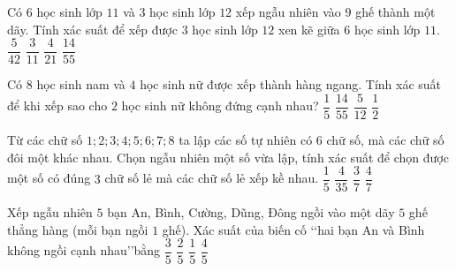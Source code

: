 \begin{ex}%
Có $6$ học sinh lớp $11$ và $3$ học sinh lớp $12$ xếp ngẫu nhiên vào $9$ ghế thành một dãy. Tính xác suất để xếp được $3$ học sinh lớp $12$ xen kẽ giữa $6$ học sinh lớp $11$.
\choice
{\True $\dfrac{5}{42}$}
{$\dfrac{3}{11}$}
{$\dfrac{4}{21}$}
{$\dfrac{14}{55}$}
\end{ex}

\begin{ex}%
Có $8$ học sinh nam và $4$ học sinh nữ được xếp thành hàng ngang. Tính xác suất để khi xếp sao cho $2$ học sinh nữ không đứng cạnh nhau?
\choice
{$\dfrac{1}{5}$}
{\True $\dfrac{14}{55}$}
{$\dfrac{5}{12}$}
{$\dfrac{1}{2}$}
\end{ex}

\begin{ex}%
Từ các chữ số $1; 2; 3; 4; 5; 6; 7; 8$ ta lập các số tự nhiên có $6$ chữ số, mà các chữ số đôi một khác nhau. Chọn ngẫu nhiên một số vừa lập, tính xác suất để chọn được một số có đúng $3$ chữ số lẻ mà các chữ số lẻ xếp kề nhau.
\choice
{$\dfrac{1}{5}$}
{\True $\dfrac{4}{35}$}
{$\dfrac{3}{7}$}
{$\dfrac{4}{7}$}
\end{ex}

\begin{ex}%
Xếp ngẫu nhiên $5$ bạn An, Bình, Cường, Dũng, Đông ngồi vào một dãy $5$ ghế thẳng hàng (mỗi bạn ngồi $1$ ghế). Xác suất của biến cố \lq\lq  hai bạn An và Bình không ngồi cạnh nhau\rq\rq bằng
\choice
{\True $\dfrac{3}{5}$}
{$\dfrac{2}{5}$}
{$\dfrac{1}{5}$}
{$\dfrac{4}{5}$}
\end{ex}




